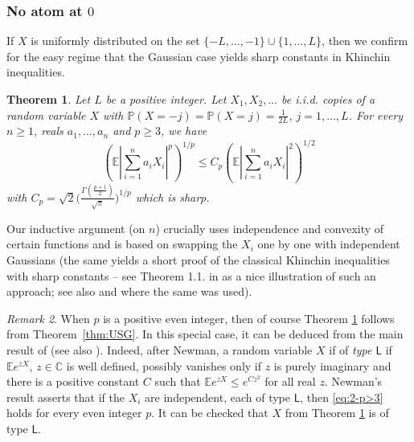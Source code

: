 \documentclass[10pt]{article}
\newcommand{\E}{\mathbb{E}}
\newcommand{\1}{\textbf{1}}
\newcommand{\C}{\mathbb{C}}
\newcommand{\p}[1]{\mathbb{P}\left( #1 \right)}
\newtheorem{theorem}{Theorem}
\theoremstyle{remark}
\newtheorem{remark}[theorem]{Remark}
\theoremstyle{definition}
\begin{document}
\subsubsection{No atom at $0$}


If $X$ is uniformly distributed on the set $\{-L,\ldots,-1\}\cup\{1,\ldots,L\}$, then we confirm for the easy regime that the Gaussian case yields sharp constants in Khinchin inequalities. 

\begin{theorem}\label{thm:2-p>3}
Let $L$ be a positive integer. Let $X_1,X_2,\ldots$ be i.i.d. copies of a random variable $X$ with $\p{X = -j} = \p{X = j} = \frac{1}{2L}$, $j = 1, \ldots, L$. For every $n \geq 1$, reals $a_1,\ldots,a_n$ and $p \geq 3$, we have
\begin{equation}\label{eq:2-p>3}
\left(\E\left|\sum_{i=1}^n a_iX_i \right|^p\right)^{1/p} \leq C_p \left(\E\left|\sum_{i=1}^n a_iX_i \right|^2\right)^{1/2} 
\end{equation}
with $C_p = \sqrt{2} \Big(\frac{\Gamma (\frac{p+1}{2})}{\sqrt{\pi}} \Big)^{1/p}$ which is sharp.
\end{theorem}



Our inductive argument (on $n$) crucially uses independence and convexity of certain functions and is based on swapping the $X_i$ one by one with independent Gaussians (the same yields a short proof of the classical Khinchin inequalities with sharp constants -- see Theorem 1.1. in \cite{FHJSZ} as a nice illustration of such an approach; see also \cite{BN} and \cite{ENT2} where the same was used). 


\begin{remark}\label{rem:p>3-even-easy}
When $p$ is a positive even integer, then of course Theorem \ref{thm:2-p>3} follows from Theorem~\ref{thm:USG}. In this special case, it can be deduced from the main result of \cite{New1} (see also \cite{New2}). Indeed, after Newman, a random variable $X$ if of \emph{type $\mathsf{L}$} if $\E e^{zX}$, $z \in \C$ is well defined, possibly vanishes only if $z$ is purely imaginary and there is a positive constant $C$ such that $\E e^{zX} \leq e^{Cz^2}$ for all real $z$. Newman's result asserts that if the $X_i$ are independent, each of type $\mathsf{L}$, then \eqref{eq:2-p>3} holds for every even integer $p$. It can be checked that $X$ from Theorem \ref{thm:2-p>3} is of type $\mathsf{L}$.
\end{remark}
\end{document}

